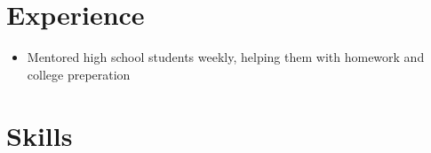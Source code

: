 \documentclass{my_cv}
\begin{document}
\section{Experience \faCogs}
\begin{itemize}
\item Mentored high school students weekly, helping them with homework and college
  preperation
\end{itemize}

\section{Skills \faBullseye}


\end{document}
